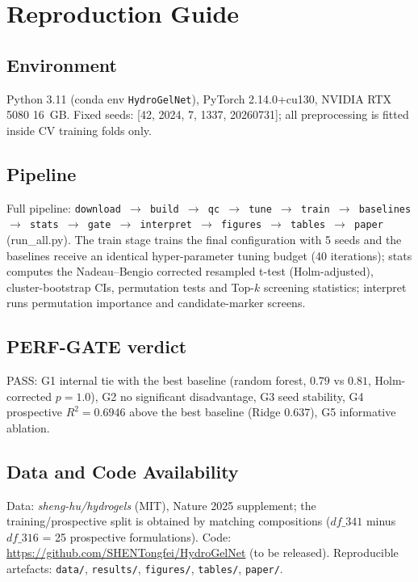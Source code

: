 \documentclass[utf8]{frontiers_suppmat}
\begin{document}
\section{Reproduction Guide}

\subsection{Environment}
Python 3.11 (conda env \texttt{HydroGelNet}), PyTorch 2.14.0+cu130, NVIDIA
RTX 5080 16~GB. Fixed seeds: [42, 2024, 7, 1337, 20260731]; all preprocessing
is fitted inside CV training folds only.

\subsection{Pipeline}
Full pipeline:
\texttt{download $\rightarrow$ build $\rightarrow$ qc $\rightarrow$ tune
$\rightarrow$ train $\rightarrow$ baselines $\rightarrow$ stats
$\rightarrow$ gate $\rightarrow$ interpret $\rightarrow$ figures
$\rightarrow$ tables $\rightarrow$ paper} (run\_all.py). The train stage
trains the final configuration with 5 seeds and the baselines receive an
identical hyper-parameter tuning budget (40 iterations); stats computes the
Nadeau--Bengio corrected resampled t-test (Holm-adjusted), cluster-bootstrap
CIs, permutation tests and Top-$k$ screening statistics; interpret runs
permutation importance and candidate-marker screens.

\subsection{PERF-GATE verdict}
PASS: G1 internal tie with the best baseline (random forest, $0.79$ vs
$0.81$, Holm-corrected $p = 1.0$), G2 no significant disadvantage, G3 seed
stability, G4 prospective $R^2 = 0.6946$ above the best baseline (Ridge
$0.637$), G5 informative ablation.

\subsection{Data and Code Availability}
Data: \emph{sheng-hu/hydrogels} (MIT), Nature 2025 supplement; the
training/prospective split is obtained by matching compositions ($df\_341$
minus $df\_316$ = 25 prospective formulations). Code:
\url{https://github.com/SHENTongfei/HydroGelNet} (to be released).
Reproducible artefacts: \texttt{data/}, \texttt{results/},
\texttt{figures/}, \texttt{tables/}, \texttt{paper/}.
\end{document}
